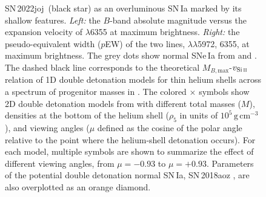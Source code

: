 \documentclass[twocolumn]{aastex631}
\newcommand{\sn}{SN\,2022joj}
\begin{document}
\begin{CJK*}{UTF8}{gbsn}
\begin{figure}
    \caption{\sn\ (black star) as an overluminous SN\,Ia marked by its shallow  features. \textit{Left:} the $B$-band absolute magnitude versus the expansion velocity of  $\lambda$6355 at maximum brightness. \textit{Right:} the pseudo-equivalent width ($p$EW) of the two  lines,  $\lambda\lambda$5972, 6355, at maximum brightness. The grey dots show normal SNe\,Ia from \citet{Zheng_2018} and \citet{Burrow_2020}. The dashed black line corresponds to the theoretical $M_{B,\mathrm{max}}$-$v_\mathrm{Si\,\textsc{ii}}$ relation of 1D double detonation models for thin helium shells across a spectrum of progenitor masses in \citet{polin_observational_2019}. The colored $\times$ symbols show 2D double detonation models from \citet{Shen_2D_2021} with different total masses ($M$), densities at the bottom of the helium shell ($\rho_5$ in units of $10^{5}\,\mathrm{g\,cm^{-3}}$), and viewing angles ($\mu$ defined as the cosine of the polar angle relative to the point where the helium-shell detonation occurs). For each model, multiple symbols are shown to summarize the effect of different viewing angles, from $\mu = -0.93$ to $\mu=+0.93$. Parameters of the potential double detonation normal SN\,Ia, SN\,2018aoz \citep{Ni_18aoz_2023}, are also overplotted as an orange diamond.}
    \label{fig:phase_space}
\end{figure}


\end{CJK*}
\end{document}
